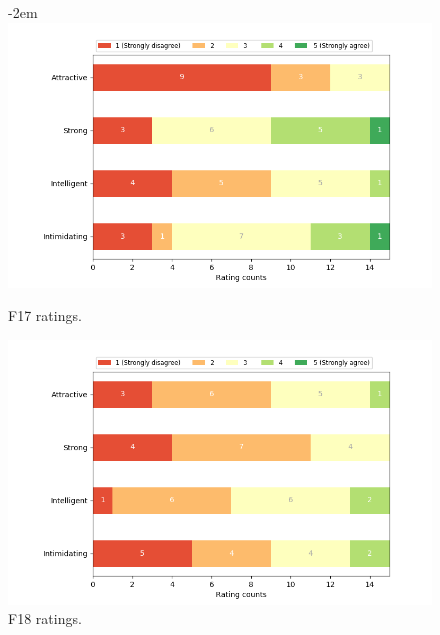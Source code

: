 \begin{figure}[H]
\linewidth-2em
  \includegraphics[width=\linewidth]{Survey/FRatings/avatar_f17.png}
  \caption{F17 ratings.}
\endminipage\hfill
{}
  \includegraphics[width=\linewidth]{Survey/FRatings/avatar_f18.png}
  \caption{F18 ratings.}
\endminipage\hfill
\end{figure}

